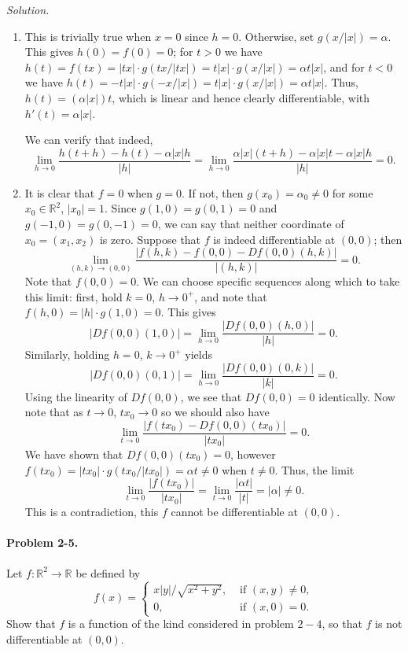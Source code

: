 \documentclass[11pt]{report}
\newcommand{\R}{\mathbb{R}}
\newcommand{\problem}[1]{\paragraph{Problem #1.}}
\newcommand{\solution}{\noindent\textit{Solution.} }
\begin{document}
    \solution \begin{enumerate}
        \item This is trivially true when $x = 0$ since $h = 0$. Otherwise, set $g(x
        / |x|) = \alpha$. This gives $h(0) = f(0) = 0$; for $t > 0$ we have $h(t) =
        f(tx) = |tx|\cdot g(tx / |tx|) = t|x|\cdot g(x / |x|) = \alpha t|x|$, and for
        $t < 0$ we have $h(t) = -t|x|\cdot g(-x / |x|) = t|x|\cdot g(x / |x|) =
        \alpha t|x|$. Thus, $h(t) = (\alpha |x|) t$, which is linear and hence
        clearly differentiable, with $h'(t) = \alpha |x|$.

        We can verify that indeed, \[
            \lim_{h \to 0} \frac{h(t + h) - h(t) - \alpha|x|h}{|h|} = \lim_{h \to 0}
            \frac{\alpha|x|(t + h) - \alpha|x| t - \alpha|x|h}{|h|} = 0.
        \] 

        \item It is clear that $f = 0$ when $g = 0$. If not, then $g(x_0) = \alpha_0 \neq
        0$ for some $x_0 \in \R^2$, $|x_0| = 1$. Since $g(1, 0) = g(0, 1) = 0$ and
        $g(-1, 0) = g(0, -1) = 0$, we can say that neither coordinate of $x_0 = (x_1,
        x_2)$ is zero. Suppose that $f$ is indeed differentiable at $(0, 0)$; then \[
            \lim_{(h, k) \to (0, 0)} \frac{|f(h, k) - f(0, 0) - Df(0, 0)(h, k)|}{|(h,
            k)|} = 0.
        \] Note that $f(0, 0) = 0$. We can choose specific sequences along which to
        take this limit: first, hold $k = 0$, $h \to 0^+$, and note that $f(h, 0) =
        |h|\cdot g(1, 0) = 0$. This gives \[
            |Df(0, 0)(1, 0)| = \lim_{h \to 0} \frac{|Df(0, 0)(h, 0)|}{|h|} = 0.
        \] Similarly, holding $h = 0$, $k \to 0^+$ yields \[
            |Df(0, 0)(0, 1)| = \lim_{h \to 0} \frac{|Df(0, 0)(0, k)|}{|k|} = 0.
        \] Using the linearity of $Df(0, 0)$, we see that $Df(0, 0) = 0$ identically.
        Now note that as $t \to 0$, $tx_0 \to 0$ so we should also have \[
            \lim_{t \to 0} \frac{|f(tx_0) - Df(0, 0)(tx_0)|}{|tx_0|} = 0.
        \] We have shown that $Df(0, 0)(tx_0) = 0$, however $f(tx_0) = |tx_0|\cdot
        g(tx_0 / |tx_0|) = \alpha t \neq 0$ when $t \neq 0$. Thus, the limit \[
            \lim_{t \to 0} \frac{|f(tx_0)|}{|tx_0|} = \lim_{t \to 0} \frac{|\alpha
            t|}{|t|} = |\alpha| \neq 0.
        \] This is a contradiction, this $f$ cannot be differentiable at $(0, 0)$.
    \end{enumerate}


    \problem{2-5} Let $f\colon \R^2 \to \R$ be defined by \[
        f(x) = \begin{cases}
            x|y| / \sqrt{x^2 + y^2}, &\text{ if } (x, y) \neq 0, \\
            0, &\text{ if } (x, 0) = 0.     
        \end{cases}
    \] Show that $f$ is a function of the kind considered in problem $2-4$, so that
    $f$ is not differentiable at $(0, 0)$. \\
\end{document}
